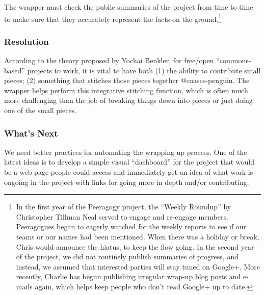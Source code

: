 The wrapper must check the public summaries of the project from time to
time to make sure that they accurately represent the facts on the
ground.\footnote{In the first year of the Peeragogy project, the
  ``Weekly Roundup'' by Christopher Tillman Neal served to engage and
  re-engage members. Peeragogues began to eagerly watched for the weekly
  reports to see if our teams or our names had been mentioned. When
  there was a holiday or break, Chris would announce the hiatus, to keep
  the flow going. In the second year of the project, we did not
  routinely publish summaries of progress, and instead, we assumed that
  interested parties will stay tuned on Google+. More recently, Charlie
  has begun publishing irregular wrap-up
  \href{http://peeragogy.org/peeragogy-wrapper-post-9-feb-5-apr-2015/}{blog
  posts} and e-mails again, which helps keep people who don't read
  Google+ up to date.}

\subsubsection{Resolution}\label{resolution}

According to the theory proposed by Yochai Benkler, for free/open
``commons-based'' projects to work, it is vital to have both (1) the
ability to contribute small pieces; (2) something that stitches those
pieces together @coases-penguin. The wrapper helps perform this
integrative stitching function, which is often much more challenging
than the job of breaking things down into pieces or just doing one of
the small pieces.

\subsubsection{What's Next}\label{whats-next}

We need better practices for automating the wrapping-up process. One of
the latest ideas is to develop a simple visual ``dashboard'' for the
project that would be a web page people could access and immediately get
an idea of what work is ongoing in the project with links for going more
in depth and/or contributing.
